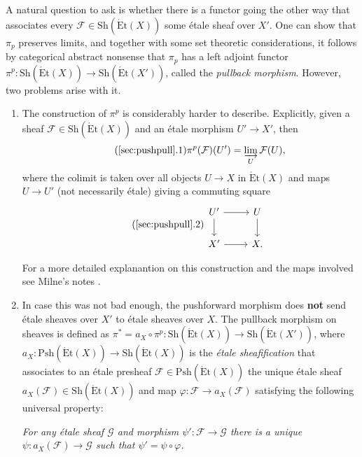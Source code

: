 \documentclass{article}
\newcommand{\Et}{\acute{\mathrm{E}}\mathrm{t}}
\newcommand{\Psh}{\mathrm{Psh}}
\newcommand{\Sh}{\mathrm{Sh}}
\theoremstyle{plain}
\theoremstyle{definition}
\begin{document}
    A natural question to ask is whether there is a functor going the other way that associates every $\mathcal{F}\in\Sh(\Et(X))$ some \'{e}tale sheaf over $X'$. One can show that $\pi_p$ preserves limits, and together with some set theoretic considerations, it follows by categorical abstract nonsense that $\pi_p$ has a left adjoint functor $\pi^p:\Sh(\Et(X))\rightarrow\Sh(\Et(X'))$, called the \textit{pullback morphism}. However, two problems arise with it.
    \begin{enumerate}[(1)]
        \item The construction of $\pi^p$ is considerably harder to describe. Explicitly, given a sheaf $\mathcal{F}\in\Sh(\Et(X))$ and an \'{e}tale morphism $U'\to X'$, then 
        \begin{equation}\label{eqn:pullbacklimit}\tag{\ref{sec:pushpull}.1}
            \pi^p(\mathcal{F})(U')=\varinjlim_U\mathcal{F}(U),
        \end{equation}
        where the colimit is taken over all objects $U\to X$ in $\Et(X)$ and maps $U\to U'$ (not necessarily \'{e}tale) giving a commuting square
        \begin{equation}\label{eqn:squarecom}\tag{\ref{sec:pushpull}.2}
            \begin{tikzcd}
                U' \arrow[r,""] \arrow[d,""] & U \arrow[d,""] \\
                X' \arrow[r,""] & X.
            \end{tikzcd}
        \end{equation}

        For a more detailed explanantion on this construction and the maps involved see Milne's notes \cite[\S8 - Inverse image of sheaves]{milneLEC}.
        \item In case this was not bad enough, the pushforward morphism does \textbf{not} send \'{e}tale sheaves over $X'$ to \'{e}tale sheaves over $X$. The pullback morphism on sheaves is defined as $\pi^*=a_X\circ\pi^p:\Sh(\Et(X))\rightarrow\Sh(\Et(X'))$, where $a_X:\Psh(\Et(X))\rightarrow\Sh(\Et(X))$ is the \textit{\'{e}tale sheafification} that associates to an \'{e}tale presheaf $\mathcal{F}\in\Psh(\Et(X))$ the unique \'{e}tale sheaf $a_X(\mathcal{F})\in\Sh(\Et(X))$ and map $\varphi:\mathcal{F}\to a_X(\mathcal{F})$ satisfying the following universal property:
        
        \textit{For any \'{e}tale sheaf $\mathcal{G}$ and morphism $\psi':\mathcal{F}\to\mathcal{G}$ there is a unique $\psi:a_X(\mathcal{F})\to\mathcal{G}$ such that $\psi'=\psi\circ\varphi$.}
    \end{enumerate}
\end{document}
